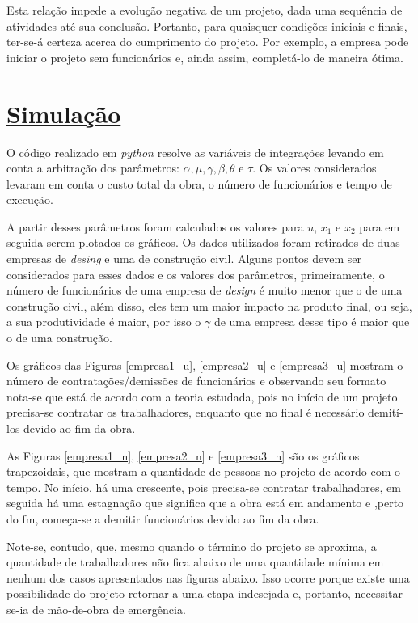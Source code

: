 \documentclass[14pt, oneside]{book}
\theoremstyle{definition}
\begin{document}
            Esta relação impede a evolução negativa de um projeto, dada uma sequência de atividades até sua conclusão. Portanto, para quaisquer condições iniciais e finais, ter-se-á certeza acerca do cumprimento do projeto. Por exemplo, a empresa pode iniciar o projeto sem funcionários e, ainda assim, completá-lo de maneira ótima.
            
            \chapter[Simulação]{\hyperlink{toc}{Simulação}}
            O código realizado em \textit{python} resolve as variáveis de integrações levando em conta a arbitração dos parâmetros: $\alpha, \mu, \gamma, \beta, \theta$ e $\tau$. Os valores considerados levaram em conta o custo total da obra, o número de funcionários e tempo de execução.
            
            A partir desses parâmetros foram calculados os valores para $u$, $x_1$ e $x_2$ para em seguida serem plotados os gráficos. Os dados utilizados foram retirados de duas empresas de \textit{desing} e uma de construção civil. Alguns pontos devem ser considerados para esses dados e os valores dos parâmetros, primeiramente, o número de funcionários de uma empresa de \textit{design} é muito menor que o de uma construção civil, além disso, eles tem um maior impacto na produto final, ou seja, a sua produtividade é maior, por isso o $\gamma$ de uma empresa desse tipo é maior que o de uma construção.
            
            Os gráficos das Figuras \ref{empresa1_u}, \ref{empresa2_u} e \ref{empresa3_u} mostram o número de contratações/demissões de funcionários e observando seu formato nota-se que está de acordo com a teoria estudada, pois no início de um projeto precisa-se contratar os trabalhadores, enquanto que no final é necessário demití-los devido ao fim da obra.
            
            As Figuras \ref{empresa1_n}, \ref{empresa2_n} e \ref{empresa3_n} são os gráficos trapezoidais, que mostram a quantidade de pessoas no projeto de acordo com o tempo. No início, há uma crescente, pois precisa-se contratar trabalhadores, em seguida há uma estagnação que significa que a obra está em andamento e ,perto do fm, começa-se a demitir funcionários devido ao fim da obra.
            
            Note-se, contudo, que, mesmo quando o término do projeto se aproxima, a quantidade de trabalhadores não fica abaixo de uma quantidade mínima em nenhum dos casos apresentados nas figuras abaixo. Isso ocorre porque existe uma possibilidade do projeto retornar a uma etapa indesejada e, portanto, necessitar-se-ia de mão-de-obra de emergência.
           
\end{document}
